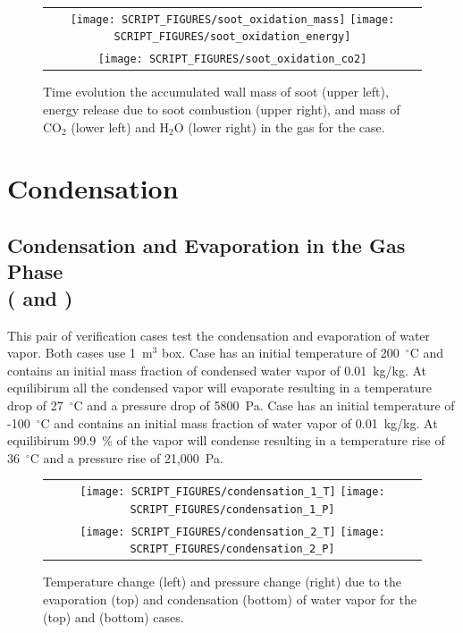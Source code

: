 \documentclass[11pt]{book}
\begin{document}
\begin{figure}[ht]
    \centering
    \begin{tabular}{c}
        \texttt{[image: SCRIPT\_FIGURES/soot\_oxidation\_mass]}
        \texttt{[image: SCRIPT\_FIGURES/soot\_oxidation\_energy]} \\
        \texttt{[image: SCRIPT\_FIGURES/soot\_oxidation\_co2]}
    \end{tabular}
    \caption[Results of the  case]{Time evolution the accumulated wall mass of soot (upper left), energy release due to soot combustion (upper right), and mass of CO$_2$ (lower left) and H$_2$O (lower right) in the gas for the  case.}
    \label{fig:soot_oxidation}
\end{figure}

\section{Condensation}
\subsection{Condensation and Evaporation in the Gas Phase\\(\texorpdfstring{ and }{condensation\_1 and condensation\_2})}
    \label{condensation_evaporation}
This pair of verification cases test the condensation and evaporation of water vapor. Both cases use 1~m$^3$ box. Case  has an initial temperature of 200~$^\circ$C and contains an initial mass fraction of condensed water vapor of 0.01~kg/kg. At equilibirum all the condensed vapor will evaporate resulting in a temperature drop of 27~$^\circ$C and a pressure drop of 5800~Pa. Case  has an initial temperature of -100~$^\circ$C and contains an initial mass fraction of water vapor of 0.01~kg/kg. At equilibirum 99.9~\% of the vapor will condense resulting in a temperature rise of 36~$^\circ$C and a pressure rise of 21,000~Pa.

\begin{figure}[ht]
    \centering
    \begin{tabular}{c}
        \texttt{[image: SCRIPT\_FIGURES/condensation\_1\_T]}
        \texttt{[image: SCRIPT\_FIGURES/condensation\_1\_P]} \\
        \texttt{[image: SCRIPT\_FIGURES/condensation\_2\_T]}
        \texttt{[image: SCRIPT\_FIGURES/condensation\_2\_P]}
    \end{tabular}
    \caption[Results of the  (top) and  (bottom) cases]{Temperature change (left) and pressure change (right) due to the evaporation (top) and condensation (bottom) of water vapor for the  (top) and  (bottom) cases.}
    \label{fig:condensation_gas}
\end{figure}
\end{document}
